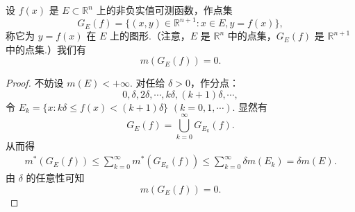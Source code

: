 \documentclass[../../main.tex]{subfiles}%
\begin{document}
\begin{corollary}[可测函数图形的测度]\label{corollary:可测函数图形的测度}
设 \( f(x) \) 是 \( E \subset \mathbb{R}^n \) 上的非负实值可测函数，作点集
\[
G_E(f) = \{ (x, y) \in \mathbb{R}^{n + 1} : x \in E, y = f(x) \},
\]
称它为 \( y = f(x) \) 在 \( E \) 上的图形.（注意，\( E \) 是 \( \mathbb{R}^n \) 中的点集，\( G_E(f) \) 是 \( \mathbb{R}^{n + 1} \) 中的点集.）我们有
\[
m(G_E(f)) = 0.
\]
\end{corollary}
\begin{proof}
不妨设 \( m(E) < +\infty \). 对任给 \( \delta > 0 \)，作分点：
\[
0, \delta, 2\delta, \cdots, k\delta, (k + 1)\delta, \cdots,
\]
令 \( E_k = \{ x : k\delta \leqslant f(x) < (k + 1)\delta \} \) \( (k = 0, 1, \cdots) \). 显然有
\[
G_E(f) = \bigcup_{k = 0}^{\infty} G_{E_k}(f).
\]
从而得
\begin{align*}
m^*(G_E(f)) \leqslant \sum_{k = 0}^{\infty} m^*(G_{E_k}(f)) \leqslant \sum_{k = 0}^{\infty} \delta m(E_k) = \delta m(E).
\end{align*}
由 \( \delta \) 的任意性可知
\[
m(G_E(f)) = 0.
\]
\end{proof}
\end{document}
